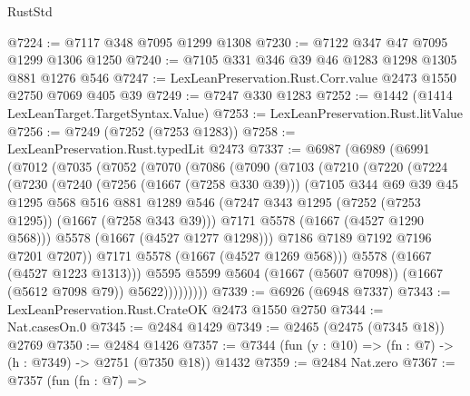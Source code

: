 \begin{lexlean}{RustStd}
\begin{coremodule}
@7224 := @7117 @348 @7095 @1299 @1308
@7230 := @7122 @347 @47 @7095 @1299 @1306 @1250
@7240 := @7105 @331 @346 @39 @46 @1283 @1298 @1305 @881 @1276 @546
@7247 := LexLeanPreservation.Rust.Corr.value @2473 @1550 @2750 @7069 @405 @39
@7249 := @7247 @330 @1283
@7252 := @1442 (@1414 LexLeanTarget.TargetSyntax.Value)
@7253 := LexLeanPreservation.Rust.litValue
@7256 := @7249 (@7252 (@7253 @1283))
@7258 := LexLeanPreservation.Rust.typedLit @2473
@7337 := @6987
    (@6989
      (@6991
        (@7012
          (@7035
            (@7052
              (@7070
                (@7086
                  (@7090
                    (@7103
                      (@7210
                        (@7220
                          (@7224
                            (@7230
                              (@7240
                                (@7256 (@1667 (@7258 @330 @39)))
                                (@7105
                                  @344
                                  @69
                                  @39
                                  @45
                                  @1295
                                  @568
                                  @516
                                  @881
                                  @1289
                                  @546
                                  (@7247 @343 @1295 (@7252 (@7253 @1295)) (@1667 (@7258 @343 @39)))
                                  @7171
                                  @5578
                                  (@1667 (@4527 @1290 @568)))
                                @5578
                                (@1667 (@4527 @1277 @1298)))
                              @7186
                              @7189
                              @7192
                              @7196
                              @7201
                              @7207))
                          @7171
                          @5578
                          (@1667 (@4527 @1269 @568)))
                        @5578
                        (@1667 (@4527 @1223 @1313)))
                      @5595
                      @5599
                      @5604
                      (@1667 (@5607 @7098))
                      (@1667 (@5612 @7098 @79))
                      @5622)))))))))
@7339 := @6926 (@6948 @7337)
@7343 := LexLeanPreservation.Rust.CrateOK @2473 @1550 @2750
@7344 := Nat.casesOn.{0}
@7345 := @2484 @1429
@7349 := @2465 (@2475 (@7345 @18)) @2769
@7350 := @2484 @1426
@7357 := @7344 (fun (y : @10) => (fn : @7) -> (h : @7349) -> @2751 (@7350 @18)) @1432
@7359 := @2484 Nat.zero
@7367 := @7357
    (fun (fn : @7) =>

\end{coremodule}
\end{lexlean}
